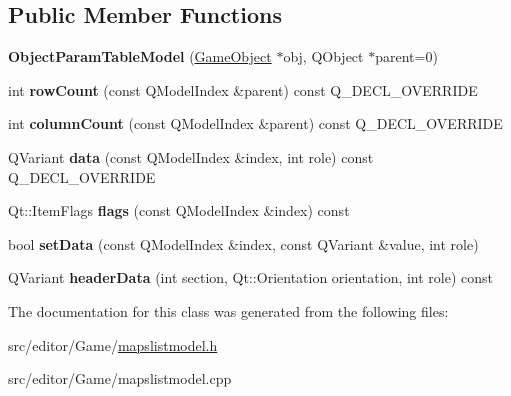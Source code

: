 \subsection*{Public Member Functions}
\begin{DoxyCompactItemize}
\item 
\hypertarget{class_object_param_table_model_a78d12e6b7666517b243f1acaf55a407f}{}\label{class_object_param_table_model_a78d12e6b7666517b243f1acaf55a407f} 
{\bfseries Object\+Param\+Table\+Model} (\hyperlink{class_game_object}{Game\+Object} $\ast$obj, Q\+Object $\ast$parent=0)
\item 
\hypertarget{class_object_param_table_model_a4be03e27217195b58f40a26ed200d103}{}\label{class_object_param_table_model_a4be03e27217195b58f40a26ed200d103} 
int {\bfseries row\+Count} (const Q\+Model\+Index \&parent) const Q\+\_\+\+D\+E\+C\+L\+\_\+\+O\+V\+E\+R\+R\+I\+DE
\item 
\hypertarget{class_object_param_table_model_af6c04299990e8c2b84247523b743d39e}{}\label{class_object_param_table_model_af6c04299990e8c2b84247523b743d39e} 
int {\bfseries column\+Count} (const Q\+Model\+Index \&parent) const Q\+\_\+\+D\+E\+C\+L\+\_\+\+O\+V\+E\+R\+R\+I\+DE
\item 
\hypertarget{class_object_param_table_model_a3da7a622e55f575af0b61dbf9d4e601a}{}\label{class_object_param_table_model_a3da7a622e55f575af0b61dbf9d4e601a} 
Q\+Variant {\bfseries data} (const Q\+Model\+Index \&index, int role) const Q\+\_\+\+D\+E\+C\+L\+\_\+\+O\+V\+E\+R\+R\+I\+DE
\item 
\hypertarget{class_object_param_table_model_a4dce826d4b641c828fe005e06b4fcf4e}{}\label{class_object_param_table_model_a4dce826d4b641c828fe005e06b4fcf4e} 
Qt\+::\+Item\+Flags {\bfseries flags} (const Q\+Model\+Index \&index) const
\item 
\hypertarget{class_object_param_table_model_a12d16a09a52c80b39d039109e108f277}{}\label{class_object_param_table_model_a12d16a09a52c80b39d039109e108f277} 
bool {\bfseries set\+Data} (const Q\+Model\+Index \&index, const Q\+Variant \&value, int role)
\item 
\hypertarget{class_object_param_table_model_ad494e01f53132ab8f3ec7e56223c4ccb}{}\label{class_object_param_table_model_ad494e01f53132ab8f3ec7e56223c4ccb} 
Q\+Variant {\bfseries header\+Data} (int section, Qt\+::\+Orientation orientation, int role) const
\end{DoxyCompactItemize}


The documentation for this class was generated from the following files\+:\begin{DoxyCompactItemize}
\item 
src/editor/\+Game/\hyperlink{mapslistmodel_8h}{mapslistmodel.\+h}\item 
src/editor/\+Game/mapslistmodel.\+cpp\end{DoxyCompactItemize}
